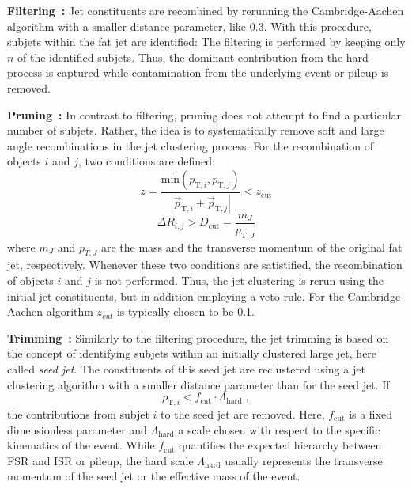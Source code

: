 \begin{description}
 \item \textbf{Filtering~\cite{Butterworth:2008tr}:} Jet constituents are recombined by rerunning the Cambridge-Aachen algorithm with a smaller distance parameter, like 0.3. With this procedure, subjets within the fat jet are identified: The filtering is performed by keeping only $n$ of the identified subjets. Thus, the dominant contribution from the hard process is captured while contamination from the underlying event or pileup is removed.
 \item \textbf{Pruning~\cite{Ellis:2009su}:} In contrast to filtering, pruning does not attempt to find a particular number of subjets. Rather, the idea is to systematically remove soft and large angle recombinations in the jet clustering process. For the recombination of objects $i$ and $j$, two conditions are defined:
\begin{equation*}
z = \frac{\mathrm{min}(p_{\mathrm{T},i}, p_{\mathrm{T},j})}{|\vec{p}_{\mathrm{T},i} + \vec{p}_{\mathrm{T},j}|} < z_\mathrm{cut}
\end{equation*}
\begin{equation*}
\Delta R_{i,j} > D_\mathrm{cut} = \frac{m_{J}}{p_{\mathrm{T}, J}}
\end{equation*}
where $m_{J}$ and $p_{T, J}$ are the mass and the transverse momentum of the original fat jet, respectively. Whenever these two conditions are satistified, the recombination of objects $i$ and $j$ is not performed. Thus, the jet clustering is rerun using the initial jet constituents, but in addition employing a veto rule. For the Cambridge-Aachen algorithm $z_{cut}$ is typically chosen to be 0.1.
 \item \textbf{Trimming~\cite{Krohn:2009th}:} Similarly to the filtering procedure, the jet trimming is based on the concept of identifying subjets within an initially clustered large jet, here called \textit{seed jet}. The constituents of this seed jet are reclustered using a jet clustering algorithm with a smaller distance parameter than for the seed jet. If 
\begin{equation*}
p_{\mathrm{T},i} < f_{\mathrm{cut}} \cdot \Lambda_{\mathrm{hard}} \; ,
\end{equation*}
the contributions from subjet $i$ to the seed jet are removed. Here, $f_{\mathrm{cut}}$ is a fixed dimensionless parameter and $\Lambda_{\mathrm{hard}}$ a scale chosen with respect to the specific kinematics of the event. While $f_{\mathrm{cut}}$ quantifies the expected hierarchy between FSR and ISR or pileup, the hard scale $\Lambda_{\mathrm{hard}}$ usually represents the transverse momentum of the seed jet or the effective mass of the event.%
\end{description} 
